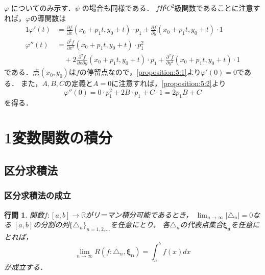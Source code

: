 \documentclass[uplatex]{jsarticle}
\makeatletter
\renewenvironment{proof}[1][\proofname]{\par
        \pushQED{\qed}
        \normalfont
        \topsep6\p@\@plus6\p@ \trivlist
        \item[\hskip\labelsep{\bfseries #1}\@addpunct{\bfseries}]\ignorespaces
    }{%
        \popQED\endtrivlist\@endpefalse
    }
\renewcommand{\proofname}{\underline{証明.}}
\newtheorem{proposition}{行間}
\makeatother
\begin{document}
\begin{proof}
    $\varphi$ についてのみ示す．$\psi$ の場合も同様である．
    $f$が$C^2$級関数であることに注意すれば，$\varphi$の導関数は
    \begin{alignat}{1}
        \varphi'(t)
        &=
              \frac{\partial f}{\partial x}(x_0 + p_1 t, y_0 + t) \cdot p_1
            + \frac{\partial f}{\partial y}(x_0 + p_1 t, y_0 + t) \cdot 1 \label{proposition:5:1} \\
        \varphi''(t)
        &=
              \frac{\partial^2 f}{\partial x^2}(x_0 + p_1 t, y_0 + t) \cdot p_1^2 \nonumber \\
        &\quad +
            2 \frac{\partial^2 f}{\partial x \partial y}(x_0 + p_1 t, y_0 + t) \cdot p_1
            + \frac{\partial^2 f}{\partial y^2}(x_0 + p_1 t, y_0 + t) \cdot 1 \label{proposition:5:2}
    \end{alignat}
    である．点$(x_0, y_0)$は$f$の停留点なので，\cref{proposition:5:1}より$\varphi'(0) = 0$である．
    また，$A, B, C$の定義と$A = 0$に注意すれば，\cref{proposition:5:2}より
    \begin{equation}
        \varphi''(0) = 0 \cdot p_1^2 + 2B \cdot p_1 + C \cdot 1 = 2p_1 B + C
    \end{equation}
    を得る．
\end{proof}

\section{1変数関数の積分}
\setcounter{subsection}{1}
\subsection{区分求積法}
\subsubsection{区分求積法の成立}
\begin{screen}
    \begin{proposition}
        関数$f:[a,b] \rightarrow \mathbb{R}$がリーマン積分可能であるとき，
        $\lim_{n\rightarrow\infty} |\triangle_n| = 0$なる
        $[a, b]$の分割の列$\{\triangle_n\}_{n=1,2,\dots}$を任意にとり，
        各$\triangle_n$の代表点集合$\mathbf{\xi_n}$を任意にとれば，
        \begin{equation}
            \lim_{n\rightarrow\infty} R(f: \triangle_n, \mathbf{\xi_n})
            =
            \int_a^b f(x) dx
        \end{equation}
        が成立する．
    \end{proposition}
\end{screen}
\end{document}
